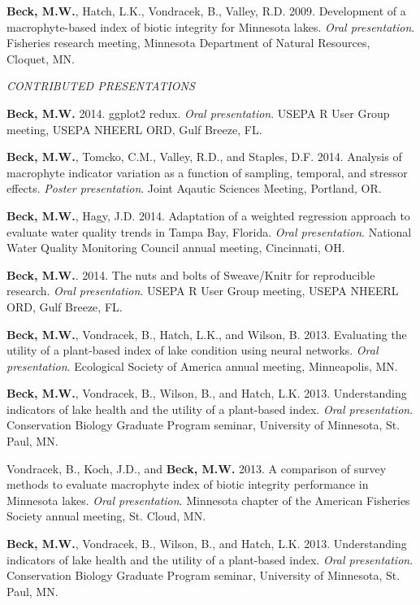 \documentclass[letterpaper,12pt]{article}
\begin{document}
{\bf Beck, M.W.}, Hatch, L.K., Vondracek, B., Valley, R.D. 2009. Development of a macrophyte-based index of biotic integrity for Minnesota lakes. \textit{Oral presentation}. Fisheries research meeting, Minnesota Department of Natural Resources, Cloquet, MN.

\vspace{\baselineskip} 
\centerline{\large{\textit{CONTRIBUTED PRESENTATIONS}}}

{\bf Beck, M.W.} 2014. ggplot2 redux. \textit{Oral presentation}. USEPA R User Group meeting, USEPA NHEERL ORD, Gulf Breeze, FL.

{\bf Beck, M.W.}, Tomcko, C.M., Valley, R.D., and Staples, D.F. 2014. Analysis of macrophyte indicator variation as a function of sampling, temporal, and stressor effects. \textit{Poster presentation}. Joint Aqautic Sciences Meeting, Portland, OR.

{\bf Beck, M.W.}, Hagy, J.D. 2014. Adaptation of a weighted regression approach to evaluate water quality trends in {T}ampa {B}ay, {F}lorida. \textit{Oral presentation}. National Water Quality Monitoring Council annual meeting, Cincinnati, OH.

{\bf Beck, M.W.}. 2014. The nuts and bolts of Sweave/Knitr for reproducible research. \textit{Oral presentation}. USEPA R User Group meeting, USEPA NHEERL ORD, Gulf Breeze, FL.

{\bf Beck, M.W.}, Vondracek, B., Hatch, L.K., and Wilson, B. 2013. Evaluating the utility of a plant-based index of lake condition using neural networks. \textit{Oral presentation}. Ecological Society of America annual meeting, Minneapolis, MN.

{\bf Beck, M.W.}, Vondracek, B., Wilson, B., and Hatch, L.K. 2013. Understanding indicators of lake health and the utility of a plant-based index. \textit{Oral presentation}. Conservation Biology Graduate Program seminar, University of Minnesota, St. Paul, MN.

Vondracek, B., Koch, J.D., and {\bf Beck, M.W.} 2013. A comparison of survey methods to evaluate macrophyte index of biotic integrity performance in Minnesota lakes. \textit{Oral presentation}. Minnesota chapter of the American Fisheries Society annual meeting, St. Cloud, MN.

{\bf Beck, M.W.}, Vondracek, B., Wilson, B., and Hatch, L.K. 2013. Understanding indicators of lake health and the utility of a plant-based index. \textit{Oral presentation}. Conservation Biology Graduate Program seminar, University of Minnesota, St. Paul, MN.
\end{document}

